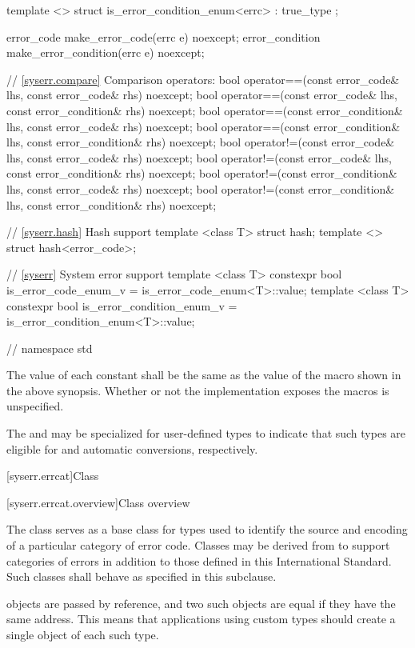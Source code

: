 \begin{codeblock}
{  template <> struct is_error_condition_enum<errc> : true_type { };

  error_code make_error_code(errc e) noexcept;
  error_condition make_error_condition(errc e) noexcept;

  // \ref{syserr.compare} Comparison operators:
  bool operator==(const error_code& lhs, const error_code& rhs) noexcept;
  bool operator==(const error_code& lhs, const error_condition& rhs) noexcept;
  bool operator==(const error_condition& lhs, const error_code& rhs) noexcept;
  bool operator==(const error_condition& lhs, const error_condition& rhs) noexcept;
  bool operator!=(const error_code& lhs, const error_code& rhs) noexcept;
  bool operator!=(const error_code& lhs, const error_condition& rhs) noexcept;
  bool operator!=(const error_condition& lhs, const error_code& rhs) noexcept;
  bool operator!=(const error_condition& lhs, const error_condition& rhs) noexcept;

  // \ref{syserr.hash} Hash support
  template <class T> struct hash;
  template <> struct hash<error_code>;

  // \ref{syserr} System error support
  template <class T> constexpr bool is_error_code_enum_v
    = is_error_code_enum<T>::value;
  template <class T> constexpr bool is_error_condition_enum_v
    = is_error_condition_enum<T>::value;
}  // namespace std
\end{codeblock}

\pnum The value of each  constant shall be the same as
the value of the  macro shown in the above synopsis. Whether
or not the  implementation exposes the 
macros is unspecified.

\pnum
The  and  may be
specialized for user-defined types to indicate that such types are eligible
for  and  automatic
conversions, respectively.

[syserr.errcat]{Class }

[syserr.errcat.overview]{Class  overview}

\pnum
The class  serves as a base class for types used
to identify the source and encoding of a particular category of error code.
Classes may be derived from  to support
categories of errors in addition to those defined in this International
Standard.
Such classes shall behave as specified in this
subclause. \begin{note}  objects are
passed by reference, and two such objects
are equal if they have the same address. This means that applications using
custom  types should create a single object of each
such type. \end{note}

